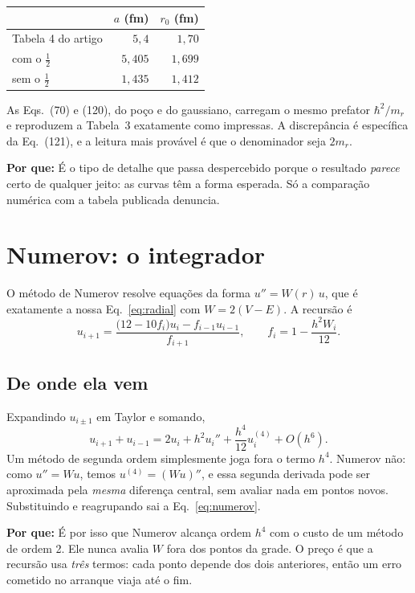 \documentclass[11pt,a4paper]{article}
\newcommand{\pq}[1]{\medskip\noindent\textbf{Por que:} #1\medskip}
\begin{document}
\begin{center}
\begin{tabular}{lrr}
\toprule
& $a$ (fm) & $r_0$ (fm) \\
\midrule
Tabela 4 do artigo & $5{,}4$ & $1{,}70$ \\
com o $\tfrac12$ & $5{,}405$ & $1{,}699$ \\
sem o $\tfrac12$ & $1{,}435$ & $1{,}412$ \\
\bottomrule
\end{tabular}
\end{center}

As Eqs.~(70) e (120), do poço e do gaussiano, carregam o mesmo prefator
$\hbar^2/m_r$ e reproduzem a Tabela~3 exatamente como impressas. A discrepância
é específica da Eq.~(121), e a leitura mais provável é que o denominador seja
$2m_r$.

\pq{É o tipo de detalhe que passa despercebido porque o resultado \emph{parece}
certo de qualquer jeito: as curvas têm a forma esperada. Só a comparação
numérica com a tabela publicada denuncia.}

\section{Numerov: o integrador}

O método de Numerov resolve equações da forma $u'' = W(r)\,u$, que é exatamente
a nossa Eq.~\eqref{eq:radial} com $W = 2(V-E)$. A recursão é
\begin{equation}
  u_{i+1} = \frac{\bigl(12 - 10 f_i\bigr)u_i - f_{i-1}u_{i-1}}{f_{i+1}},
  \qquad f_i = 1 - \frac{h^2 W_i}{12}.
  \label{eq:numerov}
\end{equation}

\subsection*{De onde ela vem}

Expandindo $u_{i\pm1}$ em Taylor e somando,
\[
  u_{i+1} + u_{i-1} = 2u_i + h^2 u_i'' + \frac{h^4}{12}u_i^{(4)} + O(h^6).
\]
Um método de segunda ordem simplesmente joga fora o termo $h^4$. Numerov não:
como $u'' = Wu$, temos $u^{(4)} = (Wu)''$, e essa segunda derivada pode ser
aproximada pela \emph{mesma} diferença central, sem avaliar nada em pontos novos.
Substituindo e reagrupando sai a Eq.~\eqref{eq:numerov}.

\pq{É por isso que Numerov alcança ordem $h^4$ com o custo de um método de ordem
2. Ele nunca avalia $W$ fora dos pontos da grade. O preço é que a recursão usa
\emph{três} termos: cada ponto depende dos dois anteriores, então um erro
cometido no arranque viaja até o fim.}
\end{document}
